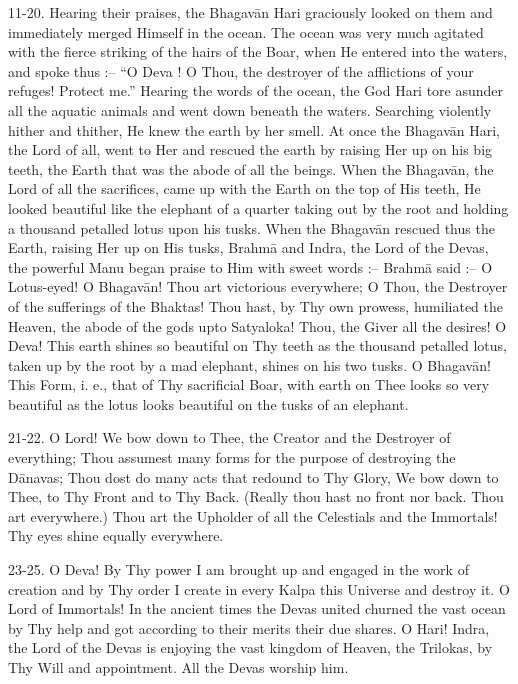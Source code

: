11-20. Hearing their praises, the Bhagav\=an Hari graciously looked on them and immediately merged Himself in the ocean. The ocean was very much agitated with the fierce striking of the hairs of the Boar, when He entered into the waters, and spoke thus :-- ``O Deva ! O Thou, the destroyer of the afflictions of your refuges! Protect me.'' Hearing the words of the ocean, the God Hari tore asunder all the aquatic animals and went down beneath the waters. Searching violently hither and thither, He knew the earth by her smell. At once the Bhagav\=an Hari, the Lord of all, went to Her and rescued the earth by raising Her up on his big teeth, the Earth that was the abode of all the beings. When the Bhagav\=an, the Lord of all the sacrifices, came up with the Earth on the top of His teeth, He looked beautiful like the elephant of a quarter taking out by the root and holding a thousand petalled lotus upon his tusks. When the Bhagav\=an rescued thus the Earth, raising Her up on His tusks, Brahm\=a and Indra, the Lord of the Devas, the powerful Manu began praise to Him with sweet words :-- Brahm\=a said :-- O Lotus-eyed! O Bhagav\=an! Thou art victorious everywhere; O Thou, the Destroyer of the sufferings of the Bhaktas! Thou hast, by Thy own prowess, humiliated the Heaven, the abode of the gods upto Satyaloka! Thou, the Giver all the desires! O Deva! This earth shines so beautiful on Thy teeth as the thousand petalled lotus, taken up by the root by a mad elephant, shines on his two tusks. O Bhagav\=an! This Form, i. e., that of Thy sacrificial Boar, with earth on Thee looks so very beautiful as the lotus looks beautiful on the tusks of an elephant.

21-22. O Lord! We bow down to Thee, the Creator and the Destroyer of everything; Thou assumest many forms for the purpose of destroying the D\=anavas; Thou dost do many acts that redound to Thy Glory, We bow down to Thee, to Thy Front and to Thy Back. (Really thou hast no front nor back. Thou art everywhere.) Thou art the Upholder of all the Celestials and the Immortals! Thy eyes shine equally everywhere.

23-25. O Deva! By Thy power I am brought up and engaged in the work of creation and by Thy order I create in every Kalpa this Universe and destroy it. O Lord of Immortals! In the ancient times the Devas united churned the vast ocean by Thy help and got according to their merits their due shares. O Hari! Indra, the Lord of the Devas is enjoying the vast kingdom of Heaven, the Trilokas, by Thy Will and appointment. All the Devas worship him.

